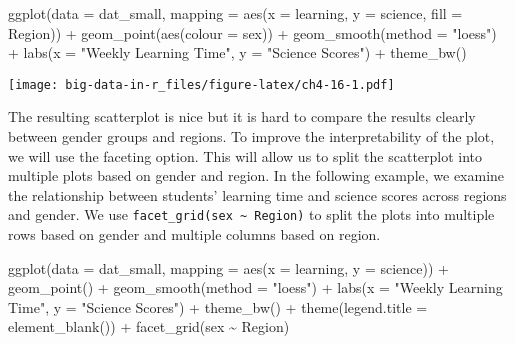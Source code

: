 \documentclass[
]{book}
\newenvironment{Shaded}{\begin{snugshade}}{\end{snugshade}}
\newcommand{\AttributeTok}[1]{\textcolor[rgb]{0.77,0.63,0.00}{#1}}
\newcommand{\FunctionTok}[1]{\textcolor[rgb]{0.00,0.00,0.00}{#1}}
\newcommand{\NormalTok}[1]{#1}
\newcommand{\SpecialCharTok}[1]{\textcolor[rgb]{0.00,0.00,0.00}{#1}}
\newcommand{\StringTok}[1]{\textcolor[rgb]{0.31,0.60,0.02}{#1}}
\begin{document}
\begin{Shaded}
\begin{Highlighting}[]
\FunctionTok{ggplot}\NormalTok{(}\AttributeTok{data =}\NormalTok{ dat\_small,}
       \AttributeTok{mapping =} \FunctionTok{aes}\NormalTok{(}\AttributeTok{x =}\NormalTok{ learning, }\AttributeTok{y =}\NormalTok{ science, }\AttributeTok{fill =}\NormalTok{ Region)) }\SpecialCharTok{+}
  \FunctionTok{geom\_point}\NormalTok{(}\FunctionTok{aes}\NormalTok{(}\AttributeTok{colour =}\NormalTok{ sex)) }\SpecialCharTok{+}
  \FunctionTok{geom\_smooth}\NormalTok{(}\AttributeTok{method =} \StringTok{"loess"}\NormalTok{) }\SpecialCharTok{+}
  \FunctionTok{labs}\NormalTok{(}\AttributeTok{x =} \StringTok{"Weekly Learning Time"}\NormalTok{, }\AttributeTok{y =} \StringTok{"Science Scores"}\NormalTok{) }\SpecialCharTok{+}
  \FunctionTok{theme\_bw}\NormalTok{()}
\end{Highlighting}
\end{Shaded}

\texttt{[image: big-data-in-r\_files/figure-latex/ch4-16-1.pdf]}

The resulting scatterplot is nice but it is hard to compare the results clearly between gender groups and regions. To improve the interpretability of the plot, we will use the faceting option. This will allow us to split the scatterplot into multiple plots based on gender and region. In the following example, we examine the relationship between students' learning time and science scores across regions and gender. We use \texttt{facet\_grid(sex\ \textasciitilde{}\ Region)} to split the plots into multiple rows based on gender and multiple columns based on region.

\begin{Shaded}
\begin{Highlighting}[]
\FunctionTok{ggplot}\NormalTok{(}\AttributeTok{data =}\NormalTok{ dat\_small,}
       \AttributeTok{mapping =} \FunctionTok{aes}\NormalTok{(}\AttributeTok{x =}\NormalTok{ learning, }\AttributeTok{y =}\NormalTok{ science)) }\SpecialCharTok{+}
  \FunctionTok{geom\_point}\NormalTok{() }\SpecialCharTok{+}
  \FunctionTok{geom\_smooth}\NormalTok{(}\AttributeTok{method =} \StringTok{"loess"}\NormalTok{) }\SpecialCharTok{+}
  \FunctionTok{labs}\NormalTok{(}\AttributeTok{x =} \StringTok{"Weekly Learning Time"}\NormalTok{, }\AttributeTok{y =} \StringTok{"Science Scores"}\NormalTok{) }\SpecialCharTok{+}
  \FunctionTok{theme\_bw}\NormalTok{() }\SpecialCharTok{+}
  \FunctionTok{theme}\NormalTok{(}\AttributeTok{legend.title =} \FunctionTok{element\_blank}\NormalTok{()) }\SpecialCharTok{+}
  \FunctionTok{facet\_grid}\NormalTok{(sex }\SpecialCharTok{\textasciitilde{}}\NormalTok{ Region)}
\end{Highlighting}
\end{Shaded}
\end{document}
